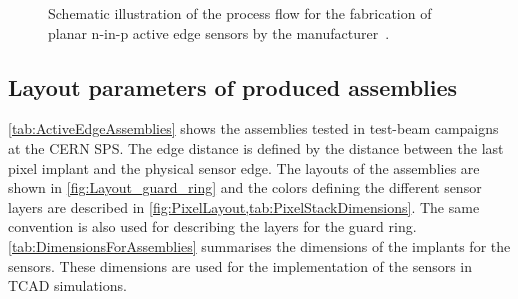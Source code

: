 \begin{figure}[htbp]
\begin{subfigure}[b]{0.3\textwidth}
    \caption{}
  \end{subfigure}

  \caption{Schematic illustration of the process flow for the
    fabrication of planar n-in-p active edge sensors by the
    manufacturer~\cite{AdvacamRef}.}
  \label{fig:AdvacamProcessFlow}
\end{figure}


\newpage
\subsection{Layout parameters of produced assemblies}
\label{sec:AEgeometry}


\cref{tab:ActiveEdgeAssemblies} shows the assemblies tested in
test-beam campaigns at the CERN SPS. The edge distance is defined by
the distance between the last pixel implant and the physical sensor
edge. The layouts of the assemblies are shown in
\cref{fig:Layout_guard_ring} and the colors defining the different
sensor layers are described in
\cref{fig:PixelLayout,tab:PixelStackDimensions}. The same convention
is also used for describing the layers for the guard
ring. \cref{tab:DimensionsForAssemblies} summarises the dimensions of
the implants for the sensors. These dimensions are used for the
implementation of the sensors in TCAD simulations.



